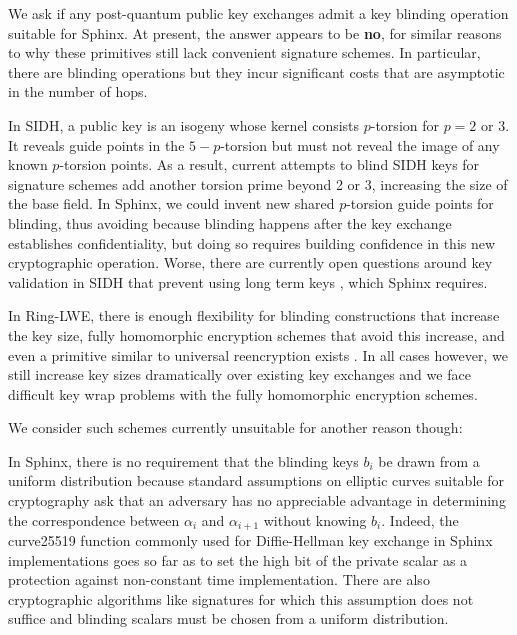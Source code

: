 \documentclass[twoside,letterpaper]{llncs}
\begin{document}
\smallskip

We ask if any post-quantum public key exchanges admit 
a key blinding operation suitable for Sphinx. 
At present, the answer appears to be {\bf no}, for similar reasons to
why these primitives still lack convenient signature schemes. 
In particular, there are blinding operations but they incur significant
costs  that are asymptotic in the number of hops.

In SIDH, a public key is an isogeny whose kernel consists $p$-torsion
for $p=2$ or $3$.  It reveals guide points in the $5-p$-torsion but
must not reveal the image of any known $p$-torsion points.  
As a result, current attempts to blind SIDH keys for signature schemes
add another torsion prime beyond 2 or 3, increasing the size of the
base field.  In Sphinx, we could invent new shared $p$-torsion guide
points for blinding, thus avoiding  because blinding happens after the key exchange
establishes confidentiality, but doing so requires building confidence
in this new cryptographic operation.  Worse, there are currently open
questions around key validation in SIDH that prevent using long term
keys \cite{SIDH-NoValidation}, which Sphinx requires.

In Ring-LWE, there is enough flexibility for blinding constructions
that increase the key size, fully homomorphic encryption schemes that
avoid this increase, and even a primitive similar to universal
reencryption exists \cite{963628}.  In all cases however, we still
increase key sizes dramatically over existing key exchanges and we face
difficult key wrap problems with the fully homomorphic encryption
schemes.

\smallskip

We consider such schemes currently unsuitable for another reason though: 

In Sphinx, there is no requirement that the blinding keys $b_i$ be
drawn from a uniform distribution because standard assumptions on
elliptic curves suitable for cryptography ask that an adversary has
no appreciable advantage in determining the correspondence between
$\alpha_i$ and $\alpha_{i+1}$ without knowing $b_i$.  
Indeed, the curve25519 function commonly used for Diffie-Hellman key
exchange in Sphinx implementations goes so far as to set the high bit
of the private scalar as a protection against non-constant time
implementation.
There are also cryptographic algorithms like signatures for which
this assumption does not suffice and blinding scalars must be chosen
from a uniform distribution.
\end{document}
